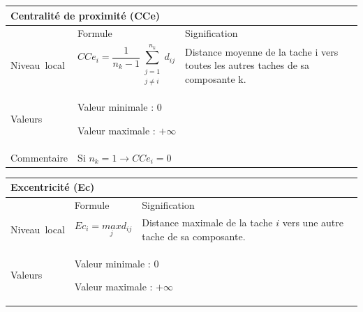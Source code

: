 \documentclass{article}
\begin{document}
\begin{table}[H]
\raggedright
\begin{tabular}{|m{3.24cm}|m{4.4810004cm}m{7.924cm}|}

\hline
\multicolumn{3}{|m{16.044998cm}|}{Centralité de proximité (CCe)}\\\hline
 &
\multicolumn{1}{m{4.4810004cm}|}{Formule} &
Signification\\\hline
Niveau~local 

 &
\multicolumn{1}{m{4.4810004cm}|}{\begin{equation*}
{\mathit{CCe}}_{i}=\frac{1}{{n}_{k}-1}\sum _{\begin{matrix}j=1\\j{\neq}i\end{matrix}}^{{n}_{k}}{{d}_{\mathit{ij}}}
\end{equation*}
} &
Distance moyenne de la tache i vers toutes les autres taches de sa composante k. \\\hline
Valeurs &
\multicolumn{2}{m{12.6050005cm}|}{Valeur minimale : 0

Valeur maximale :  $+{\infty}$

}\\\hline
Commentaire &
\multicolumn{2}{m{12.6050005cm}|}{Si  ${n}_{k}=1\rightarrow {\mathit{CCe}}_{i}=0$ }\\\hline
\end{tabular}
\end{table}
\begin{table}[H]
\raggedright
\begin{tabular}{|m{3.24cm}|m{4.4810004cm}m{7.924cm}|}

\hline
\multicolumn{3}{|m{16.044998cm}|}{Excentricité (Ec)}\\\hline
 &
\multicolumn{1}{m{4.4810004cm}|}{Formule} &
Signification\\\hline
Niveau~local 

 &
\multicolumn{1}{m{4.4810004cm}|}{\begin{equation*}
{\mathit{Ec}}_{i}=\underset{j}{\mathit{max}}{d}_{\mathit{ij}}
\end{equation*}
} &
Distance maximale de la tache $i$ vers une autre tache de sa composante. \\\hline
Valeurs &
\multicolumn{2}{m{12.6050005cm}|}{Valeur minimale : 0

Valeur maximale :  $+{\infty}$

}\\\hline
\end{tabular}
\end{table}
\end{document}
